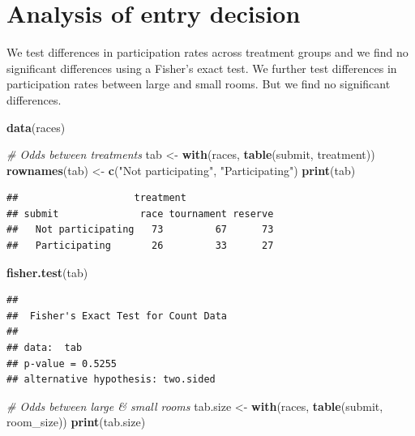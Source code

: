 \documentclass[]{article}
\newenvironment{Shaded}{\begin{snugshade}}{\end{snugshade}}
\newcommand{\KeywordTok}[1]{\textcolor[rgb]{0.13,0.29,0.53}{\textbf{#1}}}
\newcommand{\StringTok}[1]{\textcolor[rgb]{0.31,0.60,0.02}{#1}}
\newcommand{\CommentTok}[1]{\textcolor[rgb]{0.56,0.35,0.01}{\textit{#1}}}
\newcommand{\NormalTok}[1]{#1}
\let\oldShaded\Shaded
\let\endoldShaded\endShaded
\renewenvironment{Shaded}{\footnotesize\oldShaded}{\endoldShaded}
\begin{document}
\section{Analysis of entry decision}\label{analysis-of-entry-decision}

We test differences in participation rates across treatment groups and
we find no significant differences using a Fisher's exact test. We
further test differences in participation rates between large and small
rooms. But we find no significant differences.

\begin{Shaded}
\begin{Highlighting}[]
\KeywordTok{data}\NormalTok{(races)}

\CommentTok{# Odds between treatments}
\NormalTok{tab <-}\StringTok{ }\KeywordTok{with}\NormalTok{(races, }\KeywordTok{table}\NormalTok{(submit, treatment))}
\KeywordTok{rownames}\NormalTok{(tab) <-}\StringTok{ }\KeywordTok{c}\NormalTok{(}\StringTok{"Not participating"}\NormalTok{, }\StringTok{"Participating"}\NormalTok{)}
\KeywordTok{print}\NormalTok{(tab)}
\end{Highlighting}
\end{Shaded}

\begin{verbatim}
##                    treatment
## submit              race tournament reserve
##   Not participating   73         67      73
##   Participating       26         33      27
\end{verbatim}

\begin{Shaded}
\begin{Highlighting}[]
\KeywordTok{fisher.test}\NormalTok{(tab)}
\end{Highlighting}
\end{Shaded}

\begin{verbatim}
## 
##  Fisher's Exact Test for Count Data
## 
## data:  tab
## p-value = 0.5255
## alternative hypothesis: two.sided
\end{verbatim}

\begin{Shaded}
\begin{Highlighting}[]
\CommentTok{# Odds between large & small rooms}
\NormalTok{tab.size <-}\StringTok{ }\KeywordTok{with}\NormalTok{(races, }\KeywordTok{table}\NormalTok{(submit, room_size))}
\KeywordTok{print}\NormalTok{(tab.size)}
\end{Highlighting}
\end{Shaded}
\end{document}
